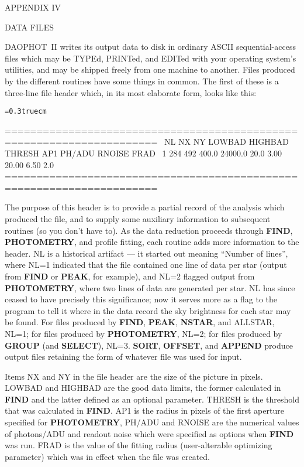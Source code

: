 \vfill
\eject
\centerline{APPENDIX  IV}
\bigskip
\centerline{DATA FILES}
\medskip

DAOPHOT~II writes its output data to disk in ordinary ASCII
sequential-access files which may be TYPEd, PRINTed, and EDITed with
your operating system's utilities, and may be shipped freely from one
machine to another.  Files produced by the different routines have some
things in common.  The first of these is a three-line file header
which, in its most elaborate form, looks like this:

\bigskip
{\noindent\obeylines\obeyspaces\frenchspacing\tt\baselineskip=0.3truecm

======================================================================
\ NL   NX   NY  LOWBAD HIGHBAD  THRESH     AP1  PH/ADU  RNOISE    FRAD
\  1  284  492   400.0 24000.0    20.0    3.00   20.00    6.50     2.0
~~~~~~~~~~~~ 
======================================================================
}
\bigskip

The purpose of this header is to provide a partial record of the
analysis which produced the file, and to supply some auxiliary
information to subsequent routines (so you don't have to).  As the data
reduction proceeds through {\bf FIND}, {\bf PHOTOMETRY}, and profile
fitting, each routine adds more information to the header. NL is a
historical artifact --- it started out meaning ``Number of lines'',
where NL=1 indicated that the file contained one line of data per star
(output from {\bf FIND} or {\bf PEAK}, for example), and NL=2 flagged
output from {\bf PHOTOMETRY}, where two lines of data are generated per
star.  NL has since ceased to have precisely this significance; now it
serves more as a flag to the program to tell it where in the data
record the sky brightness for each star may be found.  For files
produced by {\bf FIND}, {\bf PEAK}, {\bf NSTAR}, and ALLSTAR, NL=1; for
files produced by {\bf PHOTOMETRY}, NL=2; for files produced by {\bf
GROUP} (and {\bf SELECT}), NL=3.  {\bf SORT}, {\bf OFFSET}, and {\bf
APPEND} produce output files retaining the form of whatever file was
used for input.

Items NX and NY in the file header are the size of the picture in
pixels. LOWBAD and HIGHBAD are the good data limits, the former
calculated in {\bf FIND} and the latter defined as an optional
parameter.  THRESH is the threshold that was calculated in {\bf FIND}.
AP1 is the radius in pixels of the first aperture specified for {\bf
PHOTOMETRY}, PH/ADU and RNOISE are the numerical values of photons/ADU
and readout noise which were specified as options when {\bf FIND} was
run.  FRAD is the value of the fitting radius (user-alterable
optimizing parameter) which was in effect when the file was created.

